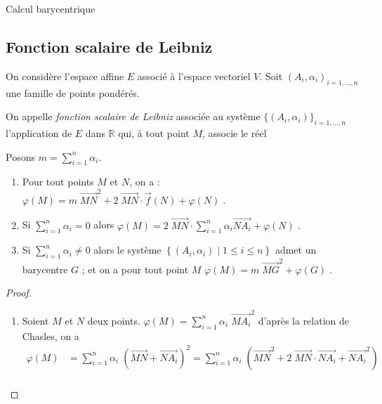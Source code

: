 \begin{chapter}{Calcul barycentrique}
\subsection{Fonction scalaire de Leibniz}
%
On consid\`ere l'espace affine $E$ associ\'e \`a l'espace vectoriel $V$. 
Soit $(A_i , \alpha_i)_{i = 1 , \dots , n}$ une famille de points pond\'er\'es.
\begin{defi}
On appelle \emph{fonction scalaire de Leibniz} associ\'ee au syst\`eme
$\{(A_i,\alpha_i)\}_{i=1,\dots,n}$ l'application de $E$ dans $\mathbb{R}$ qui, \`a tout point $M$, associe le r\'eel
\end{defi}
%
Posons $m = \sum_{i = 1}^n \alpha_i$.
%
\begin{prp} \label{prp: fonction scalaire}
\begin{enumerate}
\item \label{prp: fonction scalaire 1}
      Pour tout points $M$ et $N$, on a :
      $\displaystyle{
      \varphi(M) = m \; {\overrightarrow{MN}}^2 
                 + 2 \; \overrightarrow{MN} \cdot \vec{f}(N)
                 + \varphi(N)
      \; .
      }$
\item Si $\sum_{i = 1}^n \alpha_i = 0$ alors 
      $\displaystyle{
      \varphi (M) = 2 \; \overrightarrow{MN} \cdot \sum_{i = 1}^n \alpha_i \overrightarrow{N A_i} + \varphi(N)
      \; .
      }$
\item Si $\sum_{i = 1}^n \alpha_i \neq 0$ alors le syst\`eme $\left\{ \left( A_i , \alpha_i \right) \mid 1 \leq i \leq n \right\}$
      admet un barycentre $G$ ; et on a pour tout point $M$       
      $\displaystyle{
      \varphi(M) = m \; {\overrightarrow{MG}}^2 + \varphi(G)
      \; .
      }$
\end{enumerate}
\begin{proof}
\begin{enumerate}
\item Soient $M$ et $N$ deux points.
      $\displaystyle{\varphi(M) = \sum_{i = 1}^n \alpha_i \; {\overrightarrow{M A_i}}^2}$
      d'apr\`es la relation de Chasles, on a 
      \begin{align*}
      \varphi(M) 
                 & = \sum_{i = 1}^n \alpha_i \; \left( \overrightarrow{MN} + \overrightarrow{N A_i} \right)^2 
                   = \sum_{i = 1}^n \alpha_i \; \left( {\overrightarrow{MN}}^2 + 2 \; \overrightarrow{MN} \cdot \overrightarrow{NA_i} + {\overrightarrow{N A_i}}^2 \right) \\

\end{align*}
\end{enumerate}
\end{proof}
\end{prp}
\end{chapter}
